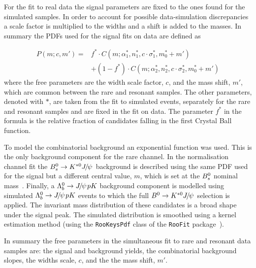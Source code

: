 For the fit to real data the signal parameters are fixed to the ones found for the simulated samples.
In order to account for possible data-simulation discrepancies a scale factor is multiplied to the widths
and a shift is added to the masses. In summary the PDFs used for the signal fits on data are defined as

\begin{equation}
\label{eq:DCB_RKst}
\begin{array} {ll}
P(m;c,m') = & f^{*} \cdot C(m;\alpha_1^{*},n_1^{*},c \cdot \sigma_1^{*}, m_0^{*} + m') \\
&+ (1 - f^{*}) \cdot C(m;\alpha_2^{*},n_2^{*},c \cdot \sigma_2^{*}, m_0^{*} + m')
\end{array}
\end{equation}  
\noindent
where the free parameters are the width scale factor, $c$, and the mass shift, $m'$, which are common between the rare
and resonant samples. The other parameters, denoted with $*$, are taken from the fit to simulated events, 
separately for the rare and resonant samples and are fixed in the fit on data.
The parameter $f^{*}$ in the formula is the relative fraction of candidates falling in the first Crystal Ball function.

To model the combinatorial background an exponential function was used.
This is the only background component for the rare channel.
In the normalisation channel fit the $\Bs  \to \Kstarz\jpsi$ background
is described using the same PDF used for the signal but a different central value, $m$,
which is set at the ${{B}^0_{s}}$ nominal mass~\cite{PDG2014}.
Finally, a $\Lb\to\jpsi pK$ background component is modelled using simulated \mbox{$\Lb\to\jpsi pK$} events
to which the full $\Bz \to \Kstarz\jpsi$ selection is applied. The invariant mass distribution
of these candidates is a broad shape under the signal peak. The simulated distribution 
is smoothed using a kernel estimation method (using the \verb!RooKeysPdf!  class of the \verb!RooFit! package~\cite{Verkerke:2003ir}).

In summary the free parameters in the simultaneous fit to rare and resonant \mumu data samples are:
the signal and background yields, the combinatorial background slopes, the widths scale, $c$, and
the the mass shift, $m'$.

